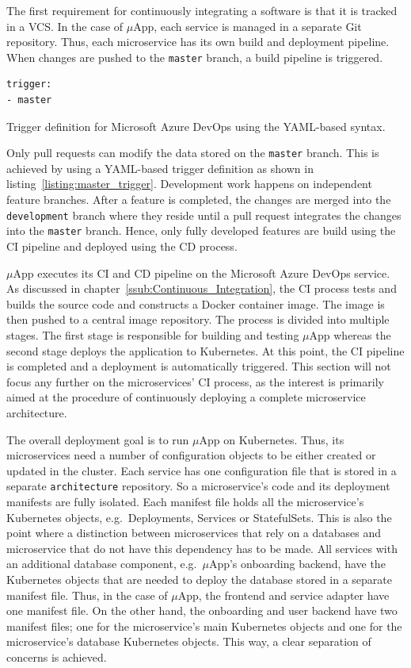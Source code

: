The first requirement for continuously integrating a software is that it is
tracked in a \ac{VCS}. In the case of $\mu$App, each service is managed in a
separate Git repository. Thus, each microservice has its own build and
deployment pipeline. When changes are pushed to the \texttt{master} branch, a
build pipeline is triggered.

\begin{listing}[H]
  \begin{verbatim}
trigger:
- master
  \end{verbatim}
  \caption{Trigger definition for Microsoft Azure DevOps using the YAML-based syntax.}%
  \label{listing:master_trigger}
\end{listing}

Only pull requests can modify the data stored on the \texttt{master} branch.
This is achieved by using a YAML-based trigger definition as shown in
listing~\ref{listing:master_trigger}. Development work happens on independent
feature branches. After a feature is completed, the changes are merged into the
\texttt{development} branch where they reside until a pull request integrates
the changes into the \texttt{master} branch. Hence, only fully developed
features are build using the \ac{CI} pipeline and deployed using the \ac{CD}
process.

$\mu$App executes its \ac{CI} and \ac{CD} pipeline on the Microsoft Azure
DevOps service. As discussed in chapter~\ref{ssub:Continuous_Integration}, the
\ac{CI} process tests and builds the source code and constructs a Docker
container image. The image is then pushed to a central image repository. The
process is divided into multiple stages. The first stage is responsible for
building and testing $\mu$App whereas the second stage deploys the application
to Kubernetes. At this point, the \ac{CI} pipeline is completed and a
deployment is automatically triggered. This section will not focus any further
on the microservices' \ac{CI} process, as the interest is primarily aimed at
the procedure of continuously deploying a complete microservice architecture.

The overall deployment goal is to run $\mu$App on Kubernetes. Thus, its
microservices need a number of configuration objects to be either created or
updated in the cluster. Each service has one configuration file that is stored
in a separate \texttt{architecture} repository. So a microservice's code and its
deployment manifests are fully isolated. Each manifest file holds all the
microservice's Kubernetes objects, e.g.\ Deployments, Services or StatefulSets.
This is also the point where a distinction between microservices that rely on a
databases and microservice that do not have this dependency has to be made. All
services with an additional database component, e.g.\ $\mu$App's onboarding
backend, have the Kubernetes objects that are needed to deploy the database
stored in a separate manifest file. Thus, in the case of $\mu$App, the frontend
and service adapter have one manifest file. On the other hand, the onboarding
and user backend have two manifest files; one for the microservice's main
Kubernetes objects and one for the microservice's database Kubernetes objects.
This way, a clear separation of concerns is achieved.

